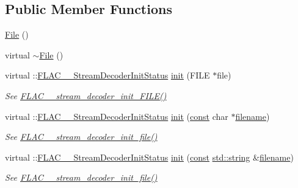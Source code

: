 \subsection*{Public Member Functions}
\begin{DoxyCompactItemize}
\item 
\hyperlink{class_f_l_a_c_1_1_decoder_1_1_file_ac11d185ad7efe2438d5450a588c66716}{File} ()
\item 
virtual \hyperlink{class_f_l_a_c_1_1_decoder_1_1_file_affb2c9d7cb5e06889bb6ec58e302e47e}{$\sim$\+File} ()
\item 
virtual \+::\hyperlink{group__flac__stream__decoder_gaaed54a24ac6310d29c5cafba79759c44}{F\+L\+A\+C\+\_\+\+\_\+\+Stream\+Decoder\+Init\+Status} \hyperlink{class_f_l_a_c_1_1_decoder_1_1_file_ab0e9926c18718bc951dfdc5923157d79}{init} (F\+I\+LE $\ast$file)
\begin{DoxyCompactList}\small\item\em See \hyperlink{group__flac__stream__decoder_ga38f9eb46bf112af205f86b4cbac9980c}{F\+L\+A\+C\+\_\+\+\_\+stream\+\_\+decoder\+\_\+init\+\_\+\+F\+I\+L\+E()} \end{DoxyCompactList}\item 
virtual \+::\hyperlink{group__flac__stream__decoder_gaaed54a24ac6310d29c5cafba79759c44}{F\+L\+A\+C\+\_\+\+\_\+\+Stream\+Decoder\+Init\+Status} \hyperlink{class_f_l_a_c_1_1_decoder_1_1_file_af110d07abd4837e9efc2fafc3f373a3d}{init} (\hyperlink{getopt1_8c_a2c212835823e3c54a8ab6d95c652660e}{const} char $\ast$\hyperlink{test__portburn_8cpp_a7efa5e9c7494c7d4586359300221aa5d}{filename})
\begin{DoxyCompactList}\small\item\em See \hyperlink{group__flac__stream__decoder_ga1692108a97012d1c5f79baf7df012c33}{F\+L\+A\+C\+\_\+\+\_\+stream\+\_\+decoder\+\_\+init\+\_\+file()} \end{DoxyCompactList}\item 
virtual \+::\hyperlink{group__flac__stream__decoder_gaaed54a24ac6310d29c5cafba79759c44}{F\+L\+A\+C\+\_\+\+\_\+\+Stream\+Decoder\+Init\+Status} \hyperlink{class_f_l_a_c_1_1_decoder_1_1_file_af14a571289919cd98039f2e680633bfd}{init} (\hyperlink{getopt1_8c_a2c212835823e3c54a8ab6d95c652660e}{const} \hyperlink{test__lib_f_l_a_c_2format_8c_ab02026ad0de9fb6c1b4233deb0a00c75}{std\+::string} \&\hyperlink{test__portburn_8cpp_a7efa5e9c7494c7d4586359300221aa5d}{filename})
\begin{DoxyCompactList}\small\item\em See \hyperlink{group__flac__stream__decoder_ga1692108a97012d1c5f79baf7df012c33}{F\+L\+A\+C\+\_\+\+\_\+stream\+\_\+decoder\+\_\+init\+\_\+file()} \end{DoxyCompactList}\item 

\end{DoxyCompactItemize}
